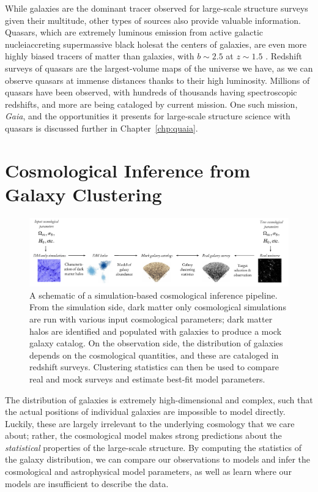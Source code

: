 While galaxies are the dominant tracer observed for large-scale structure surveys given their multitude, other types of sources also provide valuable information.
Quasars, which are extremely luminous emission from active galactic nuclei{\emdash}accreting supermassive black holes{\emdash}at the centers of galaxies, are even more highly biased tracers of matter than galaxies, with $b \sim 2.5$ at $z \sim 1.5$ \citep{laurent_clustering_2017-3}.
Redshift surveys of quasars are the largest-volume maps of the universe we have, as we can observe quasars at immense distances thanks to their high luminosity.
Millions of quasars have been observed, with hundreds of thousands having spectroscopic redshifts, and more are being cataloged by current mission.
One such mission, \emph{Gaia}, and the opportunities it presents for large-scale structure science with quasars is discussed further in Chapter~\ref{chp:quaia}.



\section{Cosmological Inference from Galaxy Clustering}

\begin{figure}
    \centering
    \includegraphics[width=\textwidth]{cosmo_inference.pdf}
    \caption{A schematic of a simulation-based cosmological inference pipeline. From the simulation side, dark matter only cosmological simulations are run with various input cosmological parameters; dark matter halos are identified and populated with galaxies to produce a mock galaxy catalog. On the observation side, the distribution of galaxies depends on the cosmological quantities, and these are cataloged in redshift surveys. Clustering statistics can then be used to compare real and mock surveys and estimate best-fit model parameters.}
    \label{fig:cosmo_inf}
\end{figure}

The distribution of galaxies is extremely high-dimensional and complex, such that the actual positions of individual galaxies are impossible to model directly.
Luckily, these are largely irrelevant to the underlying cosmology that we care about; rather, the cosmological model makes strong predictions about the \emph{statistical} properties of the large-scale structure.
By computing the statistics of the galaxy distribution, we can compare our observations to models and infer the cosmological and astrophysical model parameters, as well as learn where our models are insufficient to describe the data.

